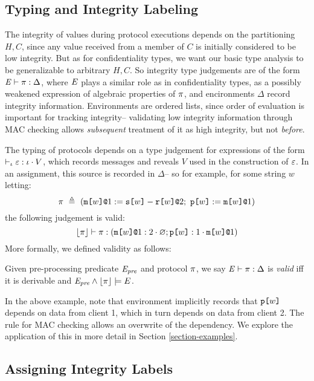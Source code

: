 \subsection{Typing and Integrity Labeling}

\ipjfig

The integrity of values during protocol executions depends on the
partitioning $H,C$, since any value received from a member of
$C$ is initially considered to be low integrity. But as for
confidentiality types, we want our basic type analysis to be
generalizable to arbitrary $H,C$. So integrity type judgements are of the form
$\mathit{E} \vdash \pi : \Delta$, where $\mathit{E}$ plays a similar role as in
confidentiality types, as a possibly weakened expression of algebraic
properties of $\pi$, and encironments $\Delta$ record integrity
information. Environments are ordered lists, since order of evaluation
is important for tracking integrity-- validating low
integrity information through MAC checking allows \emph{subsequent}
treatment of it as high integrity, but not \emph{before}.

The typing of protocols depends on a type judgement for expressions
of the form $\vdash_{\iota} \varepsilon : \iota \cdot V$, which records
messages and reveals $V$ used in the construction of $\varepsilon$.
In an assignment, this source is recorded in $\Delta$-- so for
example, for some string $w$ letting:
$$
\prog\ \defeq\ (\xassign{\mx{w}{1}}{\secret{w} - \flip{w}}{2};\ \rvl{w} := \mx{w}{1})
$$
the following judgement is valid:
$$
\lfloor \pi \rfloor \vdash \pi : (\texttt{m[}w\texttt{]}\texttt{@}1 : 2 \cdot \varnothing; \texttt{p[}w\texttt{]} : 1 \cdot \texttt{m[}w\texttt{]}\texttt{@}1)
$$
More formally, we defined validity as follows:
\begin{definition}
  Given pre-processing predicate $\mathit{E}_{\mathit{pre}}$ and protocol $\pi$, 
  we say $\mathit{E} \vdash \pi : \Delta$ is \emph{valid}
  iff it is derivable and $\mathit{E}_{\mathit{pre}} \wedge \lfloor \pi \rfloor \models E$.
\end{definition}

In the above example, note that environment implicitly records
that $\texttt{p[}w\texttt{]}$ depends on data from client 1, which in turn
depends on data from client 2. The rule for MAC
checking allows an overwrite of the dependency. We explore
the application of this in more detail in Section
\ref{section-examples}.

\cheatjfig

\subsection{Assigning Integrity Labels}

